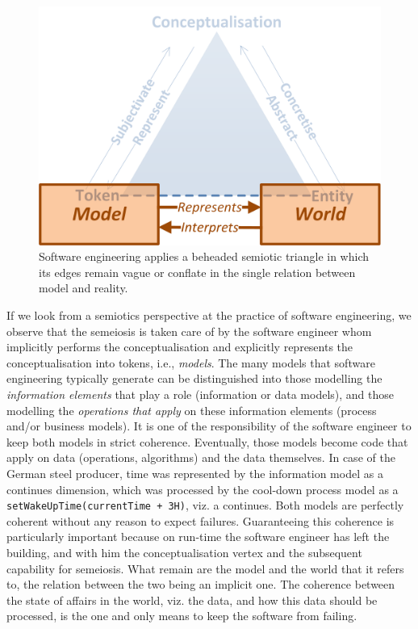 \documentclass[a4paper,11pt,oneside,oldfontcommands]{memoir}
\theoremstyle{definition}
\theoremstyle{break}		%
\numberwithin{equation}{chapter}
\numberwithin{figure}{chapter}
\begin{document}
\begin{figure}
\hypertarget{fig:software-models-reality}{%
\centering
\includegraphics{src/images/SoftwareModelsReality.png}
\caption{Software engineering applies a beheaded semiotic triangle in
which its edges remain vague or conflate in the single relation between
model and reality.}\label{fig:software-models-reality}
}
\end{figure}

If we look from a semiotics perspective at the practice of software
engineering, we observe that the semeiosis is taken care of by the
software engineer whom implicitly performs the conceptualisation and
explicitly represents the conceptualisation into tokens, i.e.,
\emph{models}. The many models that software engineering typically
generate can be distinguished into those modelling the \emph{information
elements} that play a role (information or data models), and those
modelling the \emph{operations that apply} on these information elements
(process and/or business models). It is one of the responsibility of the
software engineer to keep both models in strict coherence. Eventually,
those models become code that apply on data (operations, algorithms) and
the data themselves. In case of the German steel producer, time was
represented by the information model as a continues dimension, which was
processed by the cool-down process model as a
\texttt{setWakeUpTime(currentTime\ +\ 3H)}, viz. a continues. Both
models are perfectly coherent without any reason to expect failures.
Guaranteeing this coherence is particularly important because on
run-time the software engineer has left the building, and with him the
conceptualisation vertex and the subsequent capability for semeiosis.
What remain are the model and the world that it refers to, the relation
between the two being an implicit one. The coherence between the state
of affairs in the world, viz. the data, and how this data should be
processed, is the one and only means to keep the software from failing.
\end{document}
